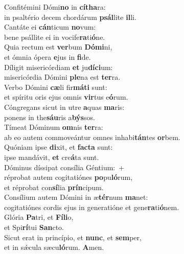 \evenverse Confitémini Dómi\textbf{no} in \textbf{cí}\textbf{tha}ra:~\*\\
\evenverse in psaltério decem chordárum \textbf{psál}lite \textbf{il}li.\\
\oddverse Cantáte ei \textbf{cán}ticum \textbf{no}vum:~\*\\
\oddverse bene psállite ei in vocife\textbf{ra}ti\textbf{ó}ne.\\
\evenverse Quia rectum est \textbf{ver}bum \textbf{Dó}\textbf{mi}ni,~\*\\
\evenverse et ómnia ópera \textbf{e}jus in \textbf{fi}de.\\
\oddverse Díligit misericórdiam \textbf{et} ju\textbf{dí}\textbf{ci}um:~\*\\
\oddverse misericórdia Dómini \textbf{ple}na est \textbf{ter}ra.\\
\evenverse Verbo Dómini \textbf{cæ}li fir\textbf{má}\textbf{ti} sunt:~\*\\
\evenverse et spíritu oris ejus omnis \textbf{vir}tus e\textbf{ó}rum.\\
\oddverse Cóngregans sicut in utre \textbf{a}quas \textbf{ma}ris:~\*\\
\oddverse ponens in the\textbf{sáu}ris a\textbf{býs}sos.\\
\evenverse Tímeat Dóminum \textbf{om}nis \textbf{ter}ra:~\*\\
\evenverse ab eo autem commoveántur omnes inhabi\textbf{tán}tes \textbf{or}bem.\\
\oddverse Quóniam ipse \textbf{di}xit, et \textbf{fa}\textbf{cta} sunt:~\*\\
\oddverse ipse mandávit, \textbf{et} cre\textbf{á}ta sunt.\\
\evenverse Dóminus díssipat consília Géntium:~+\\
\evenverse  réprobat autem cogitatiónes \textbf{po}pu\textbf{ló}rum,~\*\\
\evenverse et réprobat con\textbf{sí}lia \textbf{prín}cipum.\\
\oddverse Consílium autem Dómini in æ\textbf{tér}num \textbf{ma}net:~\*\\
\oddverse cogitatiónes cordis ejus in generatióne et gene\textbf{ra}ti\textbf{ó}nem.\\
\evenverse Glória \textbf{Pa}tri, et \textbf{Fí}\textbf{li}o,~\*\\
\evenverse et Spi\textbf{rí}tui \textbf{San}cto.\\
\oddverse Sicut erat in princípio, et \textbf{nunc}, et \textbf{sem}per,~\*\\
\oddverse et in sǽcula sæcu\textbf{ló}rum. \textbf{A}men.\\

